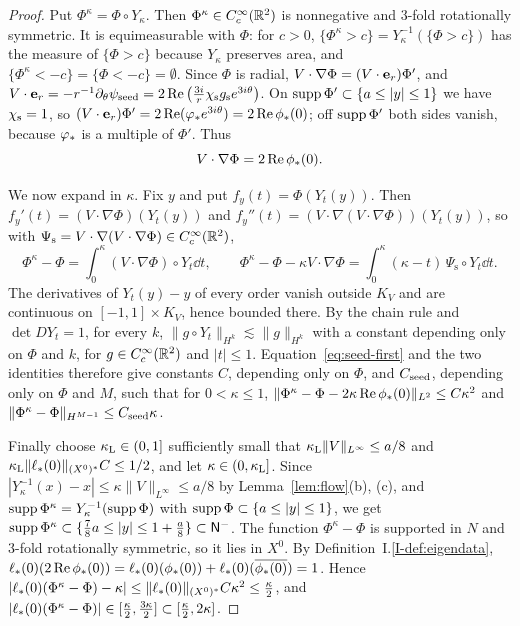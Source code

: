 \begin{proof}
Put $\Phi^\kappa=\Phi\circ Y_\kappa$. Then $\Phi^\kappa\in C_c^\infty(\mathbb{R}^2)$ is nonnegative and $3$-fold
rotationally symmetric. It is equimeasurable with $\Phi$: for $c>0$,
$\{\Phi^\kappa>c\}=Y_\kappa^{-1}(\{\Phi>c\})$ has the measure of $\{\Phi>c\}$ because
$Y_\kappa$ preserves area, and $\{\Phi^\kappa<-c\}=\{\Phi<-c\}=\emptyset$. Since
$\Phi$ is radial, $V\cdot\nabla\Phi=(V\cdot\textbf{e}_r)\Phi'$, and
$V\cdot\textbf{e}_r=-r^{-1}\partial_\theta\psi_{\mathrm{seed}}=2\Re\big(\frac{3i}r\chi_{\mathrm{s}} g_{\mathrm s}e^{3i\theta}\big)$.
On $\operatorname{supp}\Phi'\subset\{a\le|y|\le1\}$ we have $\chi_{\mathrm{s}}=1$, so
$(V\cdot\textbf{e}_r)\Phi'=2\Re(\varphi_* e^{3i\theta})=2\Re\phi_*(0)$; off $\operatorname{supp}\Phi'$ both
sides vanish, because $\varphi_*$ is a multiple of $\Phi'$. Thus
\begin{equation}
\label{eq:seed-first}
V\cdot\nabla\Phi=2\Re\phi_*(0).
\end{equation}

We now expand in $\kappa$. Fix $y$ and put $f_y(t)=\Phi(Y_t(y))$. Then
$f_y'(t)=(V\cdot\nabla\Phi)(Y_t(y))$ and $f_y''(t)=(V\cdot\nabla(V\cdot\nabla\Phi))(Y_t(y))$,
so with $\Psi_{\mathrm s}=V\cdot\nabla(V\cdot\nabla\Phi)\in C_c^\infty(\mathbb{R}^2)$,
\[
\Phi^\kappa-\Phi=\int_0^\kappa(V\cdot\nabla\Phi)\circ Y_t\dd t,\qquad
\Phi^\kappa-\Phi-\kappa V\cdot\nabla\Phi=\int_0^\kappa(\kappa-t)\,\Psi_{\mathrm s}\circ Y_t\dd t .
\]
The derivatives of $Y_t(y)-y$ of every order vanish outside $K_V$ and are
continuous on $[-1,1]\times K_V$, hence bounded there. By the chain rule and
$\det DY_t=1$, for every $k$, $\|g\circ Y_t\|_{H^k}\lesssim\|g\|_{H^k}$
with a constant depending only on $\Phi$ and $k$, for
$g\in C_c^\infty(\mathbb{R}^2)$ and $|t|\le1$.
Equation~\eqref{eq:seed-first} and the two identities therefore give constants
$C$, depending only on $\Phi$, and $C_{\mathrm{seed}}$, depending only on $\Phi$ and $M$,
such that for $0<\kappa\le1$,
$\|\Phi^\kappa-\Phi-2\kappa\Re\phi_*(0)\|_{L^2}\le C\kappa^2$ and
$\|\Phi^\kappa-\Phi\|_{H^{M-1}}\le C_{\mathrm{seed}}\kappa$.

Finally choose $\kappa_{\mathrm{L}}\in(0,1]$ sufficiently small that
$\kappa_{\mathrm{L}}\|V\|_{L^\infty}\le a/8$ and
$\kappa_{\mathrm{L}}\|\ell_*(0)\|_{(X^0)^*}C\le1/2$,
and let $\kappa\in(0,\kappa_{\mathrm{L}}]$. Since $|Y_\kappa^{-1}(x)-x|\le\kappa\|V\|_{L^\infty}\le a/8$ by
Lemma~\ref{lem:flow}\textup{(b)}, \textup{(c)}, and
$\operatorname{supp}\Phi^\kappa=Y_\kappa^{-1}(\operatorname{supp}\Phi)$ with $\operatorname{supp}\Phi\subset\{a\le|y|\le1\}$, we get
$\operatorname{supp}\Phi^\kappa\subset\{\frac78a\le|y|\le1+\frac a8\}\subset\mathsf{N}^{-}$. The function
$\Phi^\kappa-\Phi$ is supported in $N$ and $3$-fold rotationally symmetric, so it lies in $X^0$.
By Definition~I.\ref{I-def:eigendata}, $\ell_*(0)(2\Re\phi_*(0))=\ell_*(0)(\phi_*(0))+\ell_*(0)(\overline{\phi_*(0)})=1$.
Hence
$|\ell_*(0)(\Phi^\kappa-\Phi)-\kappa|\le\|\ell_*(0)\|_{(X^0)^*}C\kappa^2\le\frac\kappa2$, and
$|\ell_*(0)(\Phi^\kappa-\Phi)|\in[\frac\kappa2,\frac{3\kappa}2]\subset[\frac\kappa2,2\kappa]$.
\end{proof}
